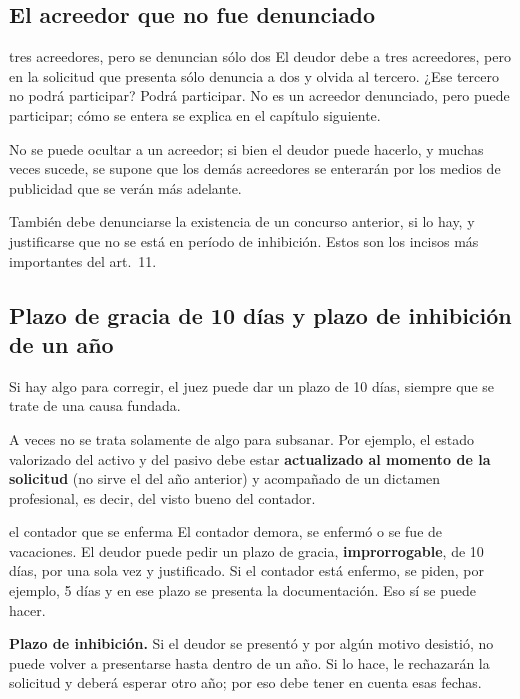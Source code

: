 \documentclass[12pt,oneside]{book}
\begin{document}
\subsection{El acreedor que no fue denunciado}

\begin{example}{tres acreedores, pero se denuncian sólo dos}
El deudor debe a tres acreedores, pero en la solicitud que presenta sólo denuncia a dos y olvida al tercero. ¿Ese tercero no podrá participar? Podrá participar. No es un acreedor denunciado, pero puede participar; cómo se entera se explica en el capítulo siguiente.
\end{example}

No se puede ocultar a un acreedor; si bien el deudor puede hacerlo, y muchas veces sucede, se supone que los demás acreedores se enterarán por los medios de publicidad que se verán más adelante.

También debe denunciarse la existencia de un concurso anterior, si lo hay, y justificarse que no se está en período de inhibición. Estos son los incisos más importantes del art.~11.

\subsection{Plazo de gracia de 10 días y plazo de inhibición de un año}

Si hay algo para corregir, el juez puede dar un plazo de 10 días, siempre que se trate de una causa fundada.

A veces no se trata solamente de algo para subsanar. Por ejemplo, el estado valorizado del activo y del pasivo debe estar \textbf{actualizado al momento de la solicitud} (no sirve el del año anterior) y acompañado de un dictamen profesional, es decir, del visto bueno del contador.

\begin{example}{el contador que se enferma}
El contador demora, se enfermó o se fue de vacaciones. El deudor puede pedir un plazo de gracia, \textbf{improrrogable}, de 10 días, por una sola vez y justificado. Si el contador está enfermo, se piden, por ejemplo, 5 días y en ese plazo se presenta la documentación. Eso sí se puede hacer.
\end{example}

\textbf{Plazo de inhibición.} Si el deudor se presentó y por algún motivo desistió, no puede volver a presentarse hasta dentro de un año. Si lo hace, le rechazarán la solicitud y deberá esperar otro año; por eso debe tener en cuenta esas fechas.
\end{document}
